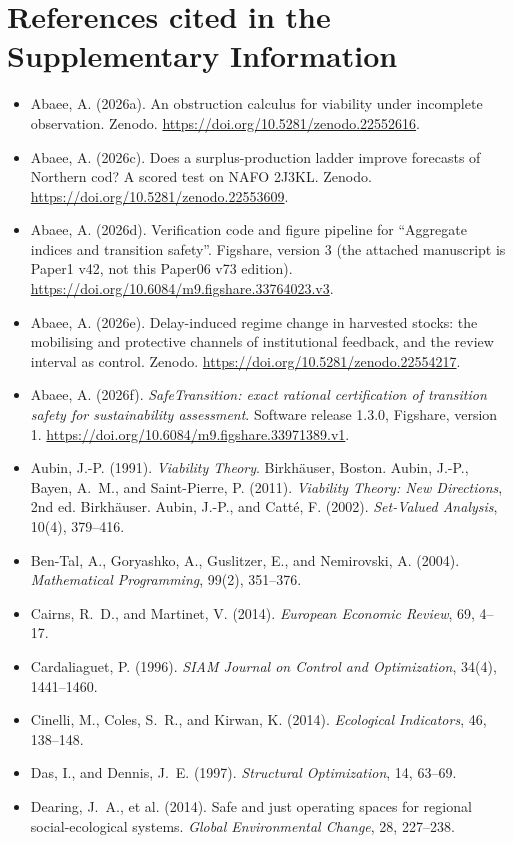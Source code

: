 \documentclass[preprint,11pt,authoryear]{elsarticle}
\theoremstyle{remark}
\begin{document}
\section*{References cited in the Supplementary Information}
\begin{itemize}[leftmargin=1.5em,itemsep=1pt]
\item Abaee, A. (2026a). An obstruction calculus for viability under incomplete observation. Zenodo. \url{https://doi.org/10.5281/zenodo.22552616}.
\item Abaee, A. (2026c). Does a surplus-production ladder improve forecasts of Northern cod? A scored test on NAFO 2J3KL. Zenodo. \url{https://doi.org/10.5281/zenodo.22553609}.
\item Abaee, A. (2026d). Verification code and figure pipeline for ``Aggregate indices and transition safety''. Figshare, version 3 (the attached manuscript is Paper1 v42, not this Paper06 v73 edition). \url{https://doi.org/10.6084/m9.figshare.33764023.v3}.
\item Abaee, A. (2026e). Delay-induced regime change in harvested stocks: the mobilising and protective channels of institutional feedback, and the review interval as control. Zenodo. \url{https://doi.org/10.5281/zenodo.22554217}.
\item Abaee, A. (2026f). \emph{SafeTransition: exact rational certification of transition safety for sustainability assessment}. Software release 1.3.0, Figshare, version 1. \url{https://doi.org/10.6084/m9.figshare.33971389.v1}.
\item Aubin, J.-P. (1991). \emph{Viability Theory}. Birkh\"auser, Boston. Aubin, J.-P., Bayen, A.~M., and Saint-Pierre, P. (2011). \emph{Viability Theory: New Directions}, 2nd ed. Birkh\"auser. Aubin, J.-P., and Catt\'e, F. (2002). \emph{Set-Valued Analysis}, 10(4), 379--416.
\item Ben-Tal, A., Goryashko, A., Guslitzer, E., and Nemirovski, A. (2004). \emph{Mathematical Programming}, 99(2), 351--376.
\item Cairns, R.~D., and Martinet, V. (2014). \emph{European Economic Review}, 69, 4--17.
\item Cardaliaguet, P. (1996). \emph{SIAM Journal on Control and Optimization}, 34(4), 1441--1460.
\item Cinelli, M., Coles, S.~R., and Kirwan, K. (2014). \emph{Ecological Indicators}, 46, 138--148.
\item Das, I., and Dennis, J.~E. (1997). \emph{Structural Optimization}, 14, 63--69.
\item Dearing, J.~A., et al. (2014). Safe and just operating spaces for regional social-ecological systems. \emph{Global Environmental Change}, 28, 227--238.

\end{itemize}
\end{document}
